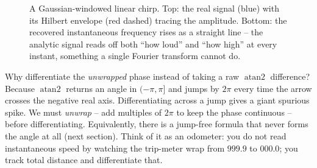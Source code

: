 \begin{figure}[H]
\centering
{}

\vspace{0.2em}

\caption{A Gaussian-windowed linear chirp. Top: the real signal (blue) with its Hilbert
envelope (red dashed) tracing the amplitude. Bottom: the recovered instantaneous
frequency rises as a straight line -- the analytic signal reads off both ``how loud'' and
``how high'' at every instant, something a single Fourier transform cannot do.}
\label{ch25:fig-chirp}
\end{figure}

\begin{walkbox}
Why differentiate the \emph{unwrapped} phase instead of taking a raw $\operatorname{atan2}$
difference? Because $\operatorname{atan2}$ returns an angle in $(-\pi,\pi]$ and jumps by
$2\pi$ every time the arrow crosses the negative real axis. Differentiating across a jump
gives a giant spurious spike. We must \emph{unwrap} -- add multiples of $2\pi$ to keep the
phase continuous -- before differentiating. Equivalently, there is a jump-free formula
that never forms the angle at all (next section). Think of it as an odometer: you do not
read instantaneous speed by watching the trip-meter wrap from $999.9$ to $000.0$; you
track total distance and differentiate that.
\end{walkbox}

